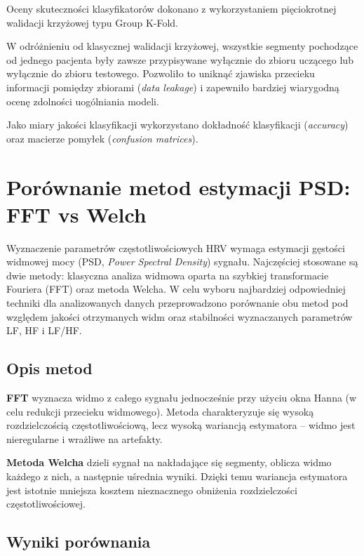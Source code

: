 \documentclass[a4paper,12pt]{article}
\begin{document}
Oceny skuteczności klasyfikatorów dokonano z wykorzystaniem pięciokrotnej walidacji krzyżowej typu Group K-Fold.

W odróżnieniu od klasycznej walidacji krzyżowej, wszystkie segmenty pochodzące od jednego pacjenta były zawsze przypisywane wyłącznie do zbioru uczącego lub wyłącznie do zbioru testowego. Pozwoliło to uniknąć zjawiska przecieku informacji pomiędzy zbiorami (\textit{data leakage}) i zapewniło bardziej wiarygodną ocenę zdolności uogólniania modeli.

Jako miary jakości klasyfikacji wykorzystano dokładność klasyfikacji (\textit{accuracy}) oraz macierze pomyłek (\textit{confusion matrices}).


\section{Porównanie metod estymacji PSD: FFT vs Welch}
\label{sec}

Wyznaczenie parametrów częstotliwościowych HRV wymaga estymacji gęstości widmowej mocy (PSD, \textit{Power Spectral Density}) sygnału. Najczęściej stosowane są dwie metody: klasyczna analiza widmowa oparta na szybkiej transformacie Fouriera (FFT) oraz metoda Welcha. W celu wyboru najbardziej odpowiedniej techniki dla analizowanych danych przeprowadzono porównanie obu metod pod względem jakości otrzymanych widm oraz stabilności wyznaczanych parametrów LF, HF i LF/HF.

\subsection{Opis metod}

\textbf{FFT} wyznacza widmo z całego sygnału jednocześnie przy użyciu okna Hanna (w celu redukcji przecieku widmowego). Metoda charakteryzuje się wysoką rozdzielczością częstotliwościową, lecz wysoką wariancją estymatora -- widmo jest nieregularne i wrażliwe na artefakty.

\textbf{Metoda Welcha} dzieli sygnał na nakładające się segmenty, oblicza widmo każdego z nich, a następnie uśrednia wyniki. Dzięki temu wariancja estymatora jest istotnie mniejsza kosztem nieznacznego obniżenia rozdzielczości częstotliwościowej.

\subsection{Wyniki porównania}
\end{document}
